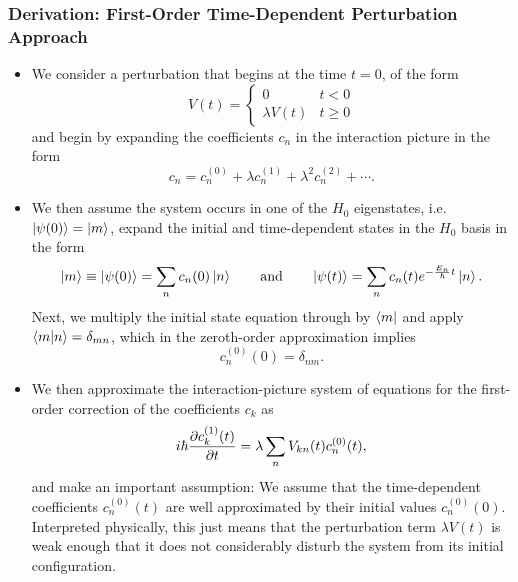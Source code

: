 \documentclass[11pt, a4paper]{article}
\begin{document}
\subsubsection{Derivation: First-Order Time-Dependent Perturbation Approach}
\begin{itemize}
    \item We consider a perturbation that begins at the time $ t = 0 $, of the form
    \begin{equation*}
        V(t) = 
        \begin{cases}
            0 & t < 0 \\
            \lambda V(t) & t \geq 0
        \end{cases}
    \end{equation*}
    and begin by expanding the coefficients $ c_{n} $ in the interaction picture in the form
    \begin{equation*}
        c_{n} = c_{n}^{(0)} + \lambda c_{n}^{(1)} + \lambda^{2} c_{n}^{(2)} + \cdots.
    \end{equation*}
    
    \item We then assume the system occurs in one of the $ H_{0} $ eigenstates, i.e. $ \ket{\psi(0)} = \ket{m} $, expand the initial and time-dependent states in the $ H_{0} $ basis in the form
    \begin{equation*}
        \ket{m} \equiv \ket{\psi(0)} = \sum_{n} c_{n}(0)\ket{n} \qquad \text{and} \qquad \ket{\psi(t)} = \sum_{n} c_{n}(t)e^{- \frac{E_{n}}{\hbar}t}\ket{n}.
    \end{equation*}
    Next, we multiply the initial state equation through by $ \bra{m} $ and apply $ \braket{m}{n} = \delta_{mn} $, which in the zeroth-order approximation implies
    \begin{equation*}
        c_{n}^{(0)}(0) = \delta_{nm}.
    \end{equation*}

    \item We then approximate the interaction-picture system of equations for the first-order correction of the coefficients $ c_{k} $ as
    \begin{equation*}
        i \hbar \pdv{c_{k}^{(1)}(t)}{t} = \lambda \sum_{n} V_{kn}(t) c_{n}^{(0)}(t),
    \end{equation*}
    and make an important assumption: We assume that the time-dependent coefficients $ c_{n}^{(0)}(t) $ are well approximated by their initial values $ c_{n}^{(0)}(0) $. Interpreted physically, this just means that the perturbation term $ \lambda V(t) $ is weak enough that it does not considerably disturb the system from its initial configuration.


\end{itemize}
\end{document}
